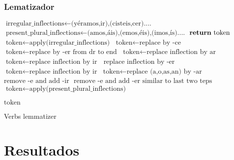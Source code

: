 \documentclass{beamer}
\begin{document}
\begin{frame}
\frametitle{Lematizador}
\begin{algorithm}[H]
\begin{scriptsize}\fontsize{6.5}{1}\selectfont

    \begin{algorithmic}[1]
    \State $\text{irregular\_inflections} \gets \text{(yéramos,ir),(cisteis,cer)....}$
     \State $\text{present\_plural\_inflections} \gets \text{(amos,áis),(emos,éis),(imos,ís)....}$
	 	 $\Return \text{ token}$ \EndIf
	 	 $\text{token} \gets \text{apply(irregular\_inflections)}$ \EndIf 
	 $\text{token} \gets \text{replace by -ce}$ \EndIf
	 $\text{token} \gets \text{replace by -er from dr to end}$\EndIf
	 $\text{token} \gets \text{replace inflection by ar}$ \EndIf
	 $\text{token} \gets \text{replace inflection by ir}$ \Else $\text{ replace inflection by -er}$ \EndIf
	 $\text{token} \gets \text{replace inflection by ir}$\EndIf
	 $\text{token} \gets \text{replace (a,o,as,an) by -ar}$ \EndIf
	 $\text{remove -e and add -ir}$ \Else $\text{ remove -e and add -er}$ \EndIf \EndIf
	  $\text{similar to last two teps}$\EndIf
	 $\text{token} \gets \text{apply(present\_plural\_inflections)}$\EndIf
	
	\State \Return $\text{token}$
        \EndProcedure
    \end{algorithmic}
    \label{alg:rAP}
    \caption{Verbs lemmatizer}
    \end{scriptsize}
\end{algorithm}
\end{frame}
\section{Resultados}
\end{document}
